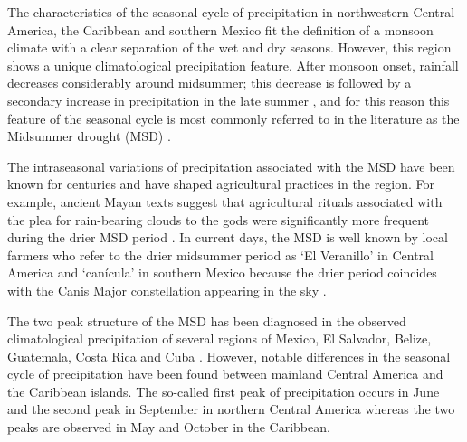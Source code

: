 The characteristics of the seasonal cycle of precipitation in northwestern Central America, the Caribbean and southern Mexico fit the definition of a monsoon climate \citep{wang2017} with a clear separation of the wet and dry seasons.
However, this region shows a unique climatological precipitation feature. After monsoon onset, rainfall decreases considerably around midsummer; this decrease is followed by a secondary increase in precipitation in the late summer \citep{mosino1966}, and for this reason this feature of the seasonal cycle is most commonly referred to in the literature as the Midsummer drought (MSD) \citep{magana1999}.    


The intraseasonal variations of precipitation associated with the MSD have been known for centuries and have shaped agricultural practices in the region. 
For example,  ancient Mayan texts suggest that agricultural rituals associated with the plea for rain-bearing clouds to the gods were significantly more frequent during the drier MSD period \citep{jobbova2018ritual}. In current days, the MSD is well known by local farmers who refer to the drier midsummer period as `El Veranillo' in Central America and `can\' icula' in southern Mexico because the drier period  coincides with the Canis Major constellation appearing in the sky \citep{dilley1996}.

%

The two peak structure of the MSD has been diagnosed in the observed climatological precipitation of several regions of Mexico, El Salvador, Belize, Guatemala, Costa Rica and Cuba \citep[e.g.][]{mosino1966,magana1999,duranquesada2017,perdigon2018,martinez2019}.
However, notable differences in the seasonal cycle of precipitation have been found between mainland Central America and the Caribbean islands. The so-called first peak of precipitation occurs in June and the second peak in September in northern Central America whereas the two peaks are observed in May and October in the Caribbean.

